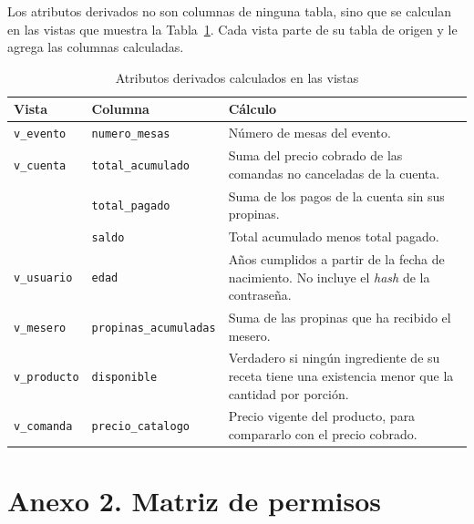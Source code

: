 Los atributos derivados no son columnas de ninguna tabla, sino que se calculan en las vistas que muestra la Tabla~\ref{tab:derivados}. Cada vista parte de su tabla de origen y le agrega las columnas calculadas.

\begin{table}[H]
    \centering
    \small
    \begin{tabularx}{\textwidth}
        {
            >{\RaggedRight\arraybackslash}p{2.3cm}
            >{\RaggedRight\arraybackslash}p{3.7cm}
            >{\RaggedRight\arraybackslash}X
        }
        \toprule
        \textbf{Vista} & \textbf{Columna} & \textbf{Cálculo} \\
        \midrule
        \texttt{v\_evento} & \texttt{numero\_mesas} & Número de mesas del evento. \\
        \texttt{v\_cuenta} & \texttt{total\_acumulado} & Suma del precio cobrado de las comandas no canceladas de la cuenta. \\
         & \texttt{total\_pagado} & Suma de los pagos de la cuenta sin sus propinas. \\
         & \texttt{saldo} & Total acumulado menos total pagado. \\
        \texttt{v\_usuario} & \texttt{edad} & Años cumplidos a partir de la fecha de nacimiento. No incluye el \textit{hash} de la contraseña. \\
        \texttt{v\_mesero} & \texttt{propinas\_acumuladas} & Suma de las propinas que ha recibido el mesero. \\
        \texttt{v\_producto} & \texttt{disponible} & Verdadero si ningún ingrediente de su receta tiene una existencia menor que la cantidad por porción. \\
        \texttt{v\_comanda} & \texttt{precio\_catalogo} & Precio vigente del producto, para compararlo con el precio cobrado. \\
        \bottomrule
    \end{tabularx}
    \captionsetup{labelfont=bf, textfont=it, labelsep=newline, justification=raggedright, singlelinecheck=false}
    \caption{Atributos derivados calculados en las vistas}
    \label{tab:derivados}
\end{table}

\newpage
{}
\section*{Anexo 2. Matriz de permisos}
\label{anexo:permisos}

